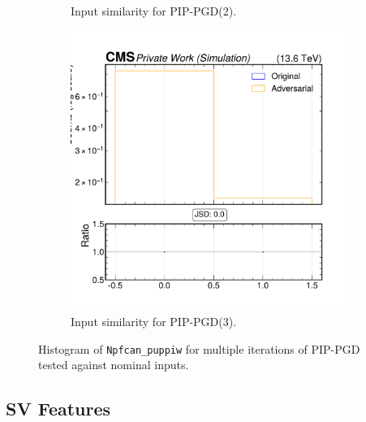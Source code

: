 \begin{figure}[h]
\begin{subfigure}[t]{0.32\textwidth}
    \caption*{Input similarity for PIP-PGD(2).}
  \end{subfigure}\hfill
  \begin{subfigure}[t]{0.32\textwidth}
    \includegraphics[width=\linewidth]{media/output/features/compare/combined_it_3/cmp_npf_arr_Npfcan_puppiw.pdf}
    \caption*{Input similarity for PIP-PGD(3).}
  \end{subfigure}

  \caption*{Histogram of \texttt{Npfcan\_puppiw} for multiple iterations of PIP-PGD tested against nominal inputs.}
  \label{fig:combined_input_Npfcan_puppiw}
\end{figure}

\FloatBarrier
\newpage
\subsection*{SV Features}

